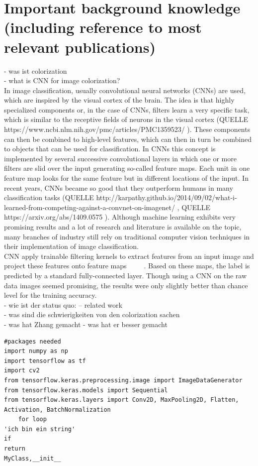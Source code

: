 \documentclass[12pt,letterpaper]{article}
\begin{document}
\section{Important background knowledge (including reference to most relevant publications)}
- was ist colorization\\
- what is CNN for image colorization?\\
In image classification, usually convolutional neural networks (CNNs) are used, which are inspired by the visual cortex of the brain. The idea is that highly specialized components or, in the case of CNNs, filters learn a very specific task, which is similar to the receptive fields of neurons in the visual cortex (QUELLE https://www.ncbi.nlm.nih.gov/pmc/articles/PMC1359523/ ). These components can then be combined to high-level features, which can then in turn be combined to objects that can be used for classification. In CNNs this concept is implemented by several successive convolutional layers in which one or more filters are slid over the input generating so-called feature maps. Each unit in one feature map looks for the same feature but in different locations of the input. In recent years, CNNs became so good that they outperform humans in many classification tasks (QUELLE http://karpathy.github.io/2014/09/02/what-i-learned-from-competing-against-a-convnet-on-imagenet/ , QUELLE https://arxiv.org/abs/1409.0575 ). Although machine learning exhibits very promising results and a lot of research and literature is available on the topic, many branches of industry still rely on traditional computer vision techniques in their implementation of image classification.\\

CNN apply trainable filtering kernels to extract features from an input image and project these features onto feature maps ~\citep{geron2019hands} ~\citep{bishop2006pattern} ~\citep{lecun1995convolutional}. Based on these maps, the label is predicted by a standard fully-connected layer.
Though using a CNN on the raw data images seemed promising, the results were only slightly better than chance level for the training accuracy.\\
- wie ist der status quo: -- related work\\
- was sind die schwierigkeiten von den colorization sachen\\
- was hat Zhang gemacht - was hat er besser gemacht\\

\begin{lstlisting}
#packages needed
import numpy as np 
import tensorflow as tf 
import cv2
from tensorflow.keras.preprocessing.image import ImageDataGenerator
from tensorflow.keras.models import Sequential
from tensorflow.keras.layers import Conv2D, MaxPooling2D, Flatten, Activation, BatchNormalization
	for loop
'ich bin ein string'
if
return
MyClass,__init__
\end{lstlisting}
\end{document}
